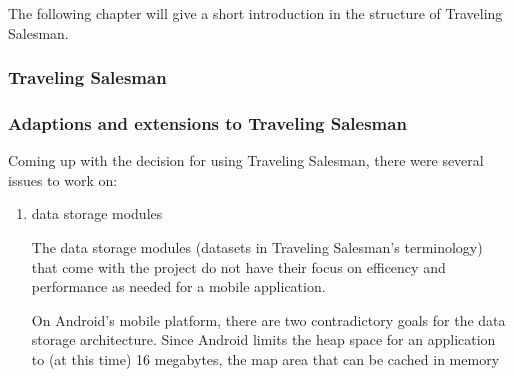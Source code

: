 The following chapter will give a short introduction in the structure of Traveling Salesman.

\subsubsection{Traveling Salesman}


\subsubsection{Adaptions and extensions to Traveling Salesman}

Coming up with the decision for using Traveling Salesman, there were several issues to work on:

\begin{enumerate}
	\item data storage modules
	
		The data storage modules (datasets in Traveling Salesman's terminology) that come with the project do not have their focus on efficency and performance as needed for a mobile application.
		
		On Android's mobile platform, there are two contradictory goals for the data storage architecture. Since Android limits the heap space for an application to (at this time) 16 megabytes, the map area that can be cached in memory 

\end{enumerate}
